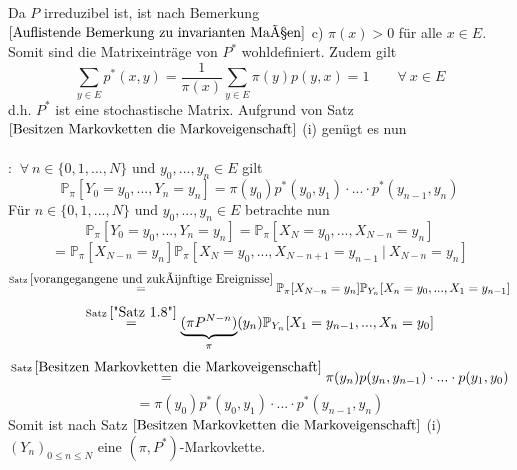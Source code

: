Da $P$ irreduzibel ist, ist nach Bemerkung $\ref{Auflistende Bemerkung zu invarianten Maßen}$ c) $\pi(x) > 0$ für alle $x \in E$. Somit sind die Matrixeinträge von $P^{*}$ wohldefiniert. Zudem gilt
\begin{equation*}
\sum_{y \in E} p^{*}(x,y) = \dfrac{1}{\pi (x)} \sum_{y \in E} \pi (y) p(y,x) = 1 \qquad \forall \: x \in E
\end{equation*}
d.h. $P^{*}$ ist eine stochastische Matrix. Aufgrund von Satz $\ref{Besitzen Markovketten die Markoveigenschaft}$ (i) genügt es nun
\\
\\
: $\: \forall \: n \in \lbrace 0,1,...,N \rbrace$ und $y_{0},...,y_{n} \in E$ gilt
\begin{equation*}
\mathbb{P}_{\pi} [Y_{0} = y_{0},...,Y_{n}=y_{n}] = \pi(y_{0})p^{*}(y_{0},y_{1}) \cdot ... \cdot p^{*}(y_{n-1},y_{n})
\end{equation*}
Für $n \in \lbrace 0,1,...,N \rbrace$ und $y_{0},...,y_{n} \in E$ betrachte nun
\begin{equation*}
\mathbb{P}_{\pi} [Y_{0} = y_{0},...,Y_{n}=y_{n}] = \mathbb{P}_{\pi} [X_{N} = y_{0},...,X_{N-n}=y_{n}] 
\end{equation*}
\begin{equation*}
= \mathbb{P}_{\pi}[X_{N-n} = y_{n}] \mathbb{P}_{\pi} [X_{N} = y_{0},...,X_{N-n+1}=y_{n-1} \: | \: X_{N-n}=y_{n}] 
\end{equation*}
\begin{equation*}
\stackrel{\mathrm{Satz} \: \ref{vorangegangene und zukünftige Ereignisse}}{=} \mathbb{P}_{\pi}[X_{N-n} = y_{n}] \mathbb{P}_{Y_{n}} [X_{n} = y_{0},...,X_{1}=y_{n-1}] 
\end{equation*}
\begin{equation*}
\stackrel{\mathrm{Satz} \: \ref{"Satz 1.8"}}{=} \underbrace{(\pi P^{N-n})}_{\pi}(y_{n}) \mathbb{P}_{Y_{n}} [X_{1} = y_{n-1},...,X_{n}=y_{0}] 
\end{equation*}
\begin{equation*}
\stackrel{\mathrm{Satz} \: \ref{Besitzen Markovketten die Markoveigenschaft}}{=} \pi(y_{n}) p(y_{n},y_{n-1}) \cdot ... \cdot p(y_{1},y_{0})
\end{equation*}
\begin{equation*}
= \pi(y_{0})p^{*}(y_{0},y_{1}) \cdot ... \cdot p^{*}(y_{n-1},y_{n})
\end{equation*}
Somit ist nach Satz $\ref{Besitzen Markovketten die Markoveigenschaft}$ (i) $(Y_{n})_{0 \leq n \leq N}$ eine $(\pi,P^{*})$-Markovkette.